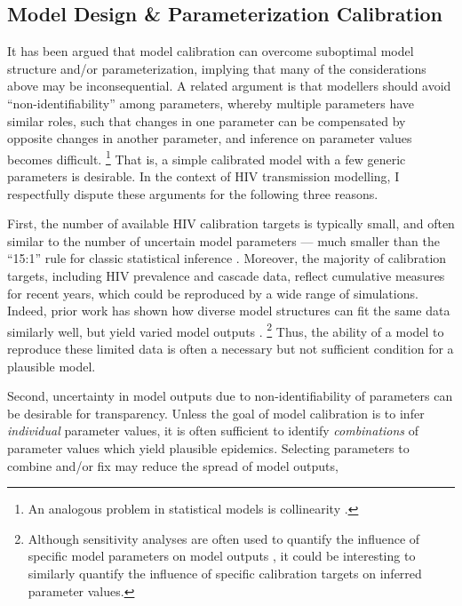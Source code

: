 \subsection{Model Design \& Parameterization \vs Calibration}\label{conc.future.cal}
It has been argued that model calibration can overcome
suboptimal model structure and/or parameterization, implying that
many of the considerations above may be inconsequential.
A related argument is that modellers should avoid ``non-identifiability'' among parameters,
whereby multiple parameters have similar roles, such that
changes in one parameter can be compensated by opposite changes in another parameter, and
inference on parameter values becomes difficult.%
\footnote{An analogous problem in statistical models is collinearity \cite{Harrell2015}.}
That is, a simple calibrated model with a few generic parameters is desirable.
In the context of HIV transmission modelling,
I respectfully dispute these arguments for the following three reasons.
\par
First, the number of available HIV calibration targets is typically small,
and often similar to the number of uncertain model parameters
--- \ie much smaller than the ``15:1'' rule for classic statistical inference \cite{Harrell2015}.
Moreover, the majority of calibration targets, including HIV prevalence and cascade data,
reflect cumulative measures for recent years,
which could be reproduced by a wide range of simulations.
Indeed, prior work has shown how diverse model structures can fit the same data similarly well,
but yield varied model outputs \cite{Hontelez2013,Eaton2015,Bernard2017,Suen2017}.%
\footnote{Although sensitivity analyses are often used to quantify the influence of
  specific model parameters on model outputs \cite{Blower1994,Johnson2016cc},
  it could be interesting to similarly quantify the influence of
  specific calibration targets on inferred parameter values.}
Thus, the ability of a model to reproduce these limited data
is often a necessary but not sufficient condition for a plausible model.
\par
Second, uncertainty in model outputs due to non-identifiability of parameters
can be desirable for transparency.
Unless the goal of model calibration is to infer \emph{individual} parameter values,
it is often sufficient to identify \emph{combinations} of parameter values
which yield plausible epidemics.
Selecting parameters to combine and/or fix may reduce the spread of model outputs,
